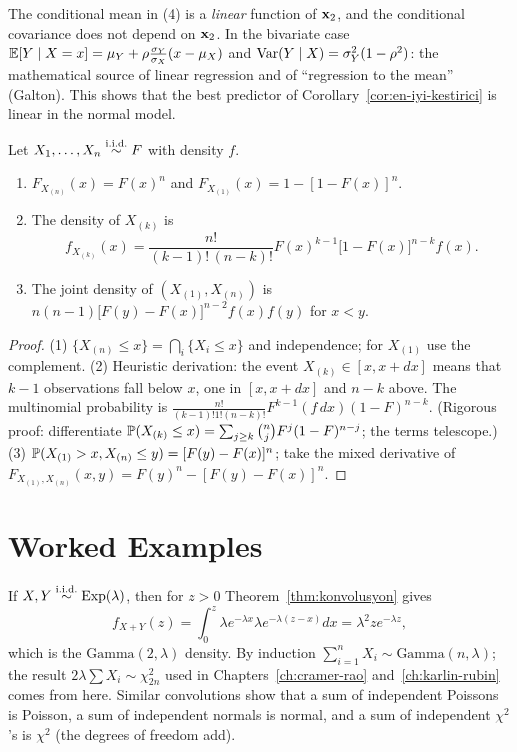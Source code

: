 \documentclass[main.tex]{subfiles}
\begin{document}
\begin{remark}
The conditional mean in (4) is a \emph{linear} function of $\x_2$, and the conditional covariance does not depend on $\x_2$. In the bivariate case $\E[Y\mid X=x]=\mu_Y+\rho\frac{\sigma_Y}{\sigma_X}(x-\mu_X)$ and $\Var(Y\mid X)=\sigma_Y^2(1-\rho^2)$: the mathematical source of linear regression and of ``regression to the mean'' (Galton). This shows that the best predictor of Corollary~\ref{cor:en-iyi-kestirici} is linear in the normal model.
\end{remark}

\begin{theorem}\label{thm:sira}
Let $X_1,\dots,X_n\iid F$ with density $f$.
\begin{enumerate}
  \item $F_{X_{(n)}}(x)=F(x)^n$ and $F_{X_{(1)}}(x)=1-[1-F(x)]^n$.
  \item The density of $X_{(k)}$ is
  \[
  f_{X_{(k)}}(x)=\frac{n!}{(k-1)!\,(n-k)!}F(x)^{k-1}\big[1-F(x)\big]^{n-k}f(x).
  \]
  \item The joint density of $(X_{(1)},X_{(n)})$ is $n(n-1)\big[F(y)-F(x)\big]^{n-2}f(x)f(y)$ for $x<y$.
\end{enumerate}
\end{theorem}
\begin{proof}
(1) $\{X_{(n)}\le x\}=\bigcap_i\{X_i\le x\}$ and independence; for $X_{(1)}$ use the complement.
(2) Heuristic derivation: the event $X_{(k)}\in[x,x+dx]$ means that $k-1$ observations fall below $x$, one in $[x,x+dx]$ and $n-k$ above. The multinomial probability is $\frac{n!}{(k-1)!1!(n-k)!}F^{k-1}(f\,dx)(1-F)^{n-k}$. (Rigorous proof: differentiate $\P(X_{(k)}\le x)=\sum_{j\ge k}\binom nj F^j(1-F)^{n-j}$; the terms telescope.)
(3) $\P(X_{(1)}>x,X_{(n)}\le y)=[F(y)-F(x)]^n$; take the mixed derivative of $F_{X_{(1)},X_{(n)}}(x,y)=F(y)^n-[F(y)-F(x)]^n$.
\end{proof}

\section{Worked Examples}

\begin{example}\label{ex:ustel-gamma}
If $X,Y\iid\text{Exp}(\lambda)$, then for $z>0$ Theorem~\ref{thm:konvolusyon} gives
\[
f_{X+Y}(z)=\int_0^z\lambda e^{-\lambda x}\lambda e^{-\lambda(z-x)}dx=\lambda^2ze^{-\lambda z},
\]
which is the $\text{Gamma}(2,\lambda)$ density. By induction $\sum_{i=1}^nX_i\sim\text{Gamma}(n,\lambda)$; the result $2\lambda\sum X_i\sim\chi^2_{2n}$ used in Chapters~\ref{ch:cramer-rao} and~\ref{ch:karlin-rubin} comes from here. Similar convolutions show that a sum of independent Poissons is Poisson, a sum of independent normals is normal, and a sum of independent $\chi^2$'s is $\chi^2$ (the degrees of freedom add).
\end{example}
\end{document}

